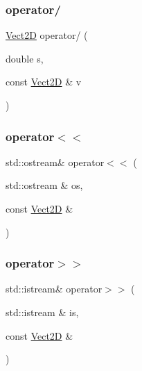 \mbox{\label{classVect2D_a024a271ab52db1ae67332c062797f6f4_a024a271ab52db1ae67332c062797f6f4}} 
\subsubsection{\texorpdfstring{operator/}{operator/}}
{\footnotesize\ttfamily \hyperlink{classVect2D}{Vect2D} operator/ (\begin{DoxyParamCaption}\item[{double}]{s,  }\item[{const \hyperlink{classVect2D}{Vect2D} \&}]{v }\end{DoxyParamCaption})\hspace{0.3cm}{\ttfamily [friend]}}

\mbox{\label{classVect2D_a7e68af9444ebe81a72ba4eec633f4d65_a7e68af9444ebe81a72ba4eec633f4d65}} 
\subsubsection{\texorpdfstring{operator$<$$<$}{operator<<}}
{\footnotesize\ttfamily std\+::ostream\& operator$<$$<$ (\begin{DoxyParamCaption}\item[{std\+::ostream \&}]{os,  }\item[{const \hyperlink{classVect2D}{Vect2D} \&}]{ }\end{DoxyParamCaption})\hspace{0.3cm}{\ttfamily [friend]}}

\mbox{\label{classVect2D_ad8969df375ebf041a3f9ccdb635357fd_ad8969df375ebf041a3f9ccdb635357fd}} 
\subsubsection{\texorpdfstring{operator$>$$>$}{operator>>}}
{\footnotesize\ttfamily std\+::istream\& operator$>$$>$ (\begin{DoxyParamCaption}\item[{std\+::istream \&}]{is,  }\item[{const \hyperlink{classVect2D}{Vect2D} \&}]{ }\end{DoxyParamCaption})\hspace{0.3cm}{\ttfamily [friend]}}



